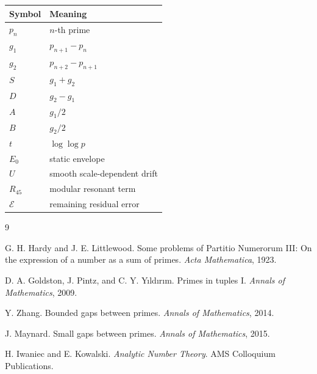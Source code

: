 \documentclass[11pt]{article}
\begin{document}
\begin{tabular}{ll}
\toprule
Symbol & Meaning\\
\midrule
\(p_n\) & \(n\)-th prime\\
\(g_1\) & \(p_{n+1}-p_n\)\\
\(g_2\) & \(p_{n+2}-p_{n+1}\)\\
\(S\) & \(g_1+g_2\)\\
\(D\) & \(g_2-g_1\)\\
\(A\) & \(g_1/2\)\\
\(B\) & \(g_2/2\)\\
\(t\) & \(\log\log p\)\\
\(E_0\) & static envelope\\
\(U\) & smooth scale-dependent drift\\
\(R_{45}\) & modular resonant term\\
\(\mathcal{E}\) & remaining residual error\\
\bottomrule
\end{tabular}

\begin{thebibliography}{9}

G. H. Hardy and J. E. Littlewood.
\newblock Some problems of Partitio Numerorum III: On the expression of a number as a sum of primes.
\newblock \emph{Acta Mathematica}, 1923.

D. A. Goldston, J. Pintz, and C. Y. Yıldırım.
\newblock Primes in tuples I.
\newblock \emph{Annals of Mathematics}, 2009.

Y. Zhang.
\newblock Bounded gaps between primes.
\newblock \emph{Annals of Mathematics}, 2014.

J. Maynard.
\newblock Small gaps between primes.
\newblock \emph{Annals of Mathematics}, 2015.

H. Iwaniec and E. Kowalski.
\newblock \emph{Analytic Number Theory}.
\newblock AMS Colloquium Publications.

\end{thebibliography}
\end{document}
